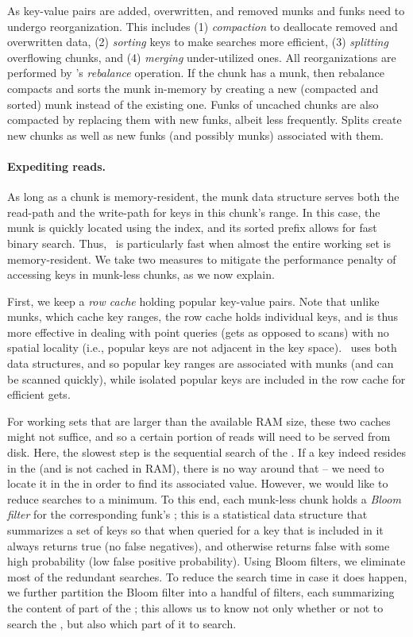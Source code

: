 As key-value pairs are added, overwritten, and removed munks and funks need to undergo reorganization. This includes  
(1) \emph{compaction} to deallocate removed and overwritten data, 
(2) \emph{sorting} keys to make searches more efficient,  
(3) \emph{splitting} overflowing chunks, and
(4) \emph{merging} under-utilized ones.
All reorganizations are performed by \sys's \emph{rebalance} operation.
If the chunk has a munk, then rebalance compacts and sorts the munk in-memory by creating a new 
(compacted and sorted) munk instead of the existing one. 
Funks of uncached chunks are also compacted by replacing them with new funks, albeit less frequently.
Splits  create new chunks as well as new  funks (and possibly munks) associated with them.

\paragraph{Expediting reads.}
As long as a chunk  is memory-resident, the munk data structure serves both the read-path and the write-path for keys in this chunk's range. 
In this case, the munk is quickly located using the index, and its sorted prefix allows for fast binary search.
Thus, \sys\ is particularly fast when almost the entire working set is memory-resident. 
We take two measures to mitigate the performance penalty of accessing keys in munk-less   chunks, 
 as we now explain.

First, we keep a \emph{row cache} holding popular key-value pairs. Note that unlike munks, which cache key ranges, the row
cache holds individual keys, and is thus more effective in dealing with point queries (gets as opposed to scans) with no
spatial locality (i.e., popular keys are not adjacent in the key space). \sys\ uses both data structures, and so 
popular key ranges are associated with munks (and can be scanned quickly), 
while  isolated popular keys are included in the row cache for efficient gets.

For working sets that are  larger than the available RAM size, these two caches might not suffice, and so a certain portion of reads will need to be served from disk. Here, the slowest step is the sequential search of the . 
If a key indeed resides in the 
 (and is not cached in RAM), there is no way around that -- we need to locate it in the  in order to find 
its associated value. However, we would like to reduce  searches to a minimum. 
To this end, each munk-less chunk holds a \emph{Bloom filter} for the corresponding funk's ; 
this is a statistical data structure that summarizes a set of keys so that 
when queried for a key that is included in it always returns true (no false negatives), 
and otherwise returns false with some high probability (low false positive probability).
Using Bloom filters, we eliminate most of the redundant   searches.
To reduce the  search time in case it does happen, 
we further  partition the Bloom filter into a  handful of filters, each summarizing the 
content of part of the ; this allows us to know not only whether or not to search the 
, but also which part of it to search.  
 



